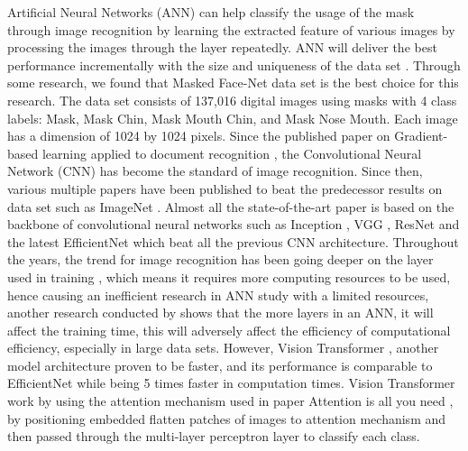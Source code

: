 \documentclass{article}
\begin{document}
Artificial Neural Networks (ANN) can help classify the usage of the mask through image recognition by learning the extracted feature of various images by processing the images through the layer repeatedly. ANN will deliver the best performance incrementally with the size and uniqueness of the data set \citep{shahinfar2020datasize}. Through some research, we found that Masked Face-Net data set \citep{Cabani2021} is the best choice for this research. The data set consists of 137,016 digital images using masks with 4 class labels: Mask, Mask Chin, Mask Mouth Chin, and Mask Nose Mouth. Each image has a dimension of 1024 by 1024 pixels.
Since the published paper on Gradient-based learning applied to document recognition \citep{lecun1998cnn}, the Convolutional Neural Network (CNN) has become the standard of image recognition. Since then, various multiple papers have been published to beat the predecessor results on data set such as ImageNet \citep{deng2009imagenet}. Almost all the state-of-the-art paper is based on the backbone of convolutional neural networks such as Inception \citep{szegedey2014inception}, VGG \citep{simonyan15vgg}, ResNet \citep{he2015resnet} and the latest EfficientNet \citep{tan2019efficientnet} which beat all the previous CNN architecture. Throughout the years, the trend for image recognition has been going deeper on the layer used in training \citep{alzubaidi2021surveycnn}, which means it requires more computing resources to be used, hence causing an inefficient research in ANN study with a limited resources, another research conducted by \citep{novanto2020} shows that the more layers in an ANN, it will affect the training time, this will adversely affect the efficiency of computational efficiency, especially in large data sets. However, Vision Transformer \citep{Dosovitskiy2020} , another model architecture proven to be faster, and its performance is comparable to EfficientNet while being 5 times faster in computation times. Vision Transformer work by using the attention mechanism used in paper Attention is all you need \citep{Vaswani2017}, by positioning embedded flatten patches of images to attention mechanism and then passed through the multi-layer perceptron layer to classify each class.
\end{document}
